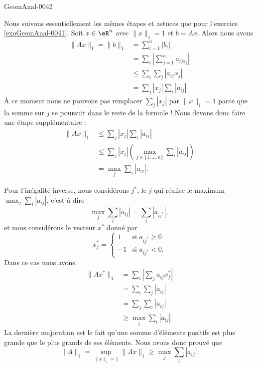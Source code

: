 \begin{corrige}{GeomAnal-0042}

    Nous suivons essentiellement les mêmes étapes et astuces que pour l'exercice \ref{exoGeomAnal-0041}. Soit \( x\in\eR^n\) avec \( \| x \|_1=1\) et \( b=Ax\). Alors nous avons
    \begin{subequations}
        \begin{align}
            \| Ax \|_1=\| b \|_1&=\sum_{i=1}^n| b_i |\\
            &=\sum_i\left| \sum_{j=1}^na_{ijx_j} \right| \\
            &\leq\sum_i\sum_j| a_{ij}x_j |\\
            &=\sum_j| x_j |\sum_i| a_{ij} |
        \end{align}
    \end{subequations}
    À ce moment nous ne pouvons pas remplacer \( \sum_j| x_j |\) par \( \| x \|_1=1\) parce que la somme sur \( j\) se poursuit dans le reste de la formule ! Nous devons donc faire une étape supplémentaire :
    \begin{subequations}
        \begin{align}
            \| Ax \|_1&\leq\sum_j| x_j |\sum_i| a_{ij} |\\
            &\leq\sum_j| x_j |\left( \max_{j\in\{ 1,\ldots,n \}}\sum_i| a_{ij} | \right)\\
            &=\max_j\sum_{i}| a_{ij} |.
        \end{align}
    \end{subequations}

    Pour l'inégalité inverse, nous considérons \( j^*\), le \( j\) qui réalise le maximum \( \max_j\sum_i| a_{ij} |\), c'est-à-dire
    \begin{equation}
        \max_j\sum_i| a_{ij} |=\sum_i| a_{ij^*} |,
    \end{equation}
    et nous considérons le vecteur \( x^*\) donné par
    \begin{equation}
        x^*_j=\begin{cases}
            1    &   \text{si } a_{ij^*}\geq 0\\
            -1    &    \text{si }a_{ij^*}<0.
        \end{cases}
    \end{equation}
    Dans ce cas nous avons
    \begin{subequations}
        \begin{align}
            \| Ax^* \|_1&=\sum_i\left| \sum_ja_{ij}x_j^* \right| \\
            &=\sum_i\sum_j| a_{ij} |\\
            &=\sum_{j}\sum_i| a_{ij} |\\
            &\geq\max_j\sum_i| a_{ij} |
        \end{align}
    \end{subequations}
    La dernière majoration est le fait qu'une somme d'éléments positifs est plus grande que le plus grands de ses éléments. Nous avons donc prouvé que
    \begin{equation}
        \| A \|_1=\sup_{\| x \|_1=1}\| Ax \|_1\geq\max_j\sum_i| a_{ij} |.
    \end{equation}

\end{corrige}
